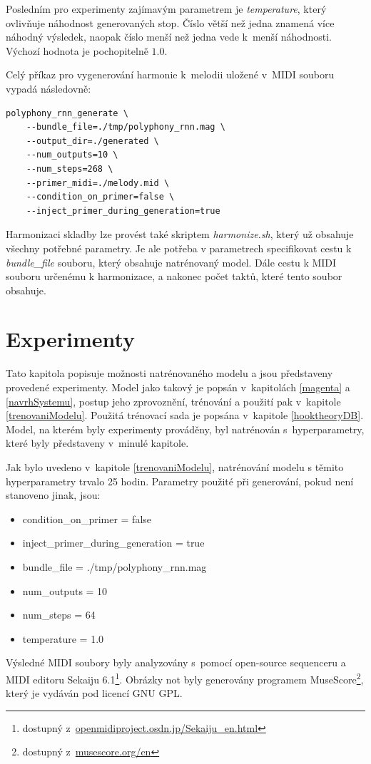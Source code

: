 \par
Posledním pro experimenty zajímavým parametrem je \emph{temperature},
který ovlivňuje náhodnost generovaných stop.
Číslo větší než jedna znamená více náhodný výsledek,
naopak číslo menší než jedna vede k~menší náhodnosti.
Výchozí hodnota je pochopitelně $1.0$.
\par

Celý příkaz pro vygenerování harmonie k~melodii
uložené v~MIDI souboru vypadá následovně:

\begin{verbatim}
polyphony_rnn_generate \
    --bundle_file=./tmp/polyphony_rnn.mag \
    --output_dir=./generated \
    --num_outputs=10 \
    --num_steps=268 \
    --primer_midi=./melody.mid \
    --condition_on_primer=false \
    --inject_primer_during_generation=true    
\end{verbatim}

Harmonizaci skladby lze provést také skriptem \emph{harmonize.sh},
který už obsahuje všechny potřebné parametry.
Je ale potřeba v parametrech specifikovat 
cestu k \emph{bundle\_file} souboru, 
který obsahuje natrénovaný model.
Dále cestu k MIDI souboru určenému k harmonizace,
a nakonec počet taktů, které tento soubor obsahuje.

\chapter{Experimenty}
\label{experimenty}
Tato kapitola popisuje možnosti natrénovaného modelu 
a jsou představeny provedené experimenty.
Model jako takový je popsán v~kapitolách \ref{magenta} a \ref{navrhSystemu},
postup jeho zprovoznění, trénování a použití pak v~kapitole \ref{trenovaniModelu}.
Použitá trénovací sada je popsána v~kapitole \ref{hooktheoryDB}.
Model, na kterém byly experimenty prováděny, 
byl natrénován s~hyperparametry, které byly představeny v~minulé kapitole.

Jak bylo uvedeno v~kapitole \ref{trenovaniModelu},
natrénování modelu s těmito hyperparametry trvalo 25 hodin.
Parametry použité při generování, pokud není stanoveno jinak, jsou:
\begin{itemize}
    \item condition\_on\_primer = false
    \item inject\_primer\_during\_generation = true
    \item bundle\_file = ./tmp/polyphony\_rnn.mag
    \item num\_outputs = 10 
    \item num\_steps = 64
    \item temperature = 1.0
\end{itemize}
Výsledné MIDI soubory byly analyzovány s~pomocí open-source 
sequenceru a MIDI editoru Sekaiju 6.1\footnote{dostupný z~\url{openmidiproject.osdn.jp/Sekaiju_en.html}}.
Obrázky not byly generovány programem MuseScore\footnote{dostupný z~\url{musescore.org/en}}, 
který je vydáván pod licencí GNU GPL.

